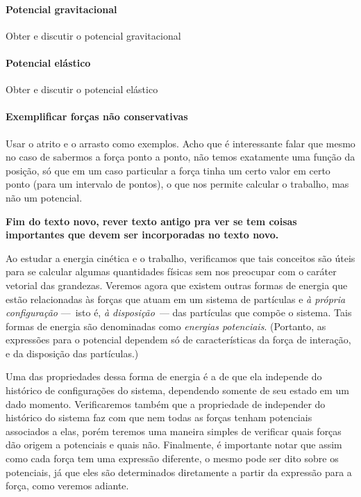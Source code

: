 \paragraph{Potencial gravitacional}
Obter e discutir o potencial gravitacional

\paragraph{Potencial elástico}
Obter e discutir o potencial elástico

\paragraph{Exemplificar forças não conservativas}
Usar o atrito e o arrasto como exemplos. Acho que é interessante falar que mesmo no caso de sabermos a força ponto a ponto, não temos exatamente uma função da posição, só que em um caso particular a força tinha um certo valor em certo ponto (para um intervalo de pontos), o que nos permite calcular o trabalho, mas não um potencial.

\textbf{Fim do texto novo, rever texto antigo pra ver se tem coisas importantes que devem ser incorporadas no texto novo.}

Ao estudar a energia cinética e o trabalho, verificamos que tais conceitos são úteis para se calcular algumas quantidades físicas sem nos preocupar com o caráter vetorial das grandezas. Veremos agora que existem outras formas de energia que estão relacionadas às forças que atuam em um sistema de partículas e \emph{à própria configuração} ---~isto é, \emph{à disposição}~--- das partículas que compõe o sistema. Tais formas de energia são denominadas como \emph{energias potenciais}. (Portanto, as expressões para o potencial dependem só de características da força de interação, e da disposição das partículas.)

Uma das propriedades dessa forma de energia é a de que ela independe do histórico de configurações do sistema, dependendo somente de seu estado em um dado momento. Verificaremos também que a propriedade de independer do histórico do sistema faz com que nem todas as forças tenham potenciais associados a elas, porém teremos uma maneira simples de verificar quais forças dão origem a potenciais e quais não. Finalmente, é importante notar que assim como cada força tem uma expressão diferente, o mesmo pode ser dito sobre os potenciais, já que eles são determinados diretamente a partir da expressão para a força, como veremos adiante.

